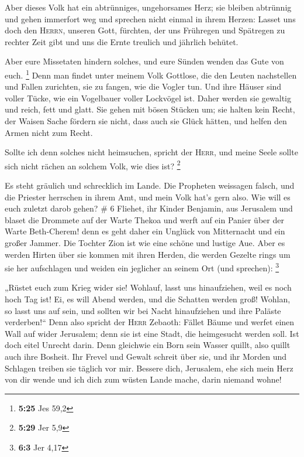  Aber dieses Volk hat ein abtrünniges, ungehorsames Herz;
sie bleiben abtrünnig und gehen immerfort weg  und
sprechen nicht einmal in ihrem Herzen: Lasset uns doch den
\textsc{Herrn}, unseren Gott, fürchten, der uns Frühregen und Spätregen
zu rechter Zeit gibt und uns die Ernte treulich und jährlich behütet.

 Aber eure Missetaten hindern solches, und eure Sünden
wenden das Gute von euch. \footnote{\textbf{5:25} Jes 59,2}
 Denn man findet unter meinem Volk Gottlose, die den
Leuten nachstellen und Fallen zurichten, sie zu fangen, wie die Vogler
tun.  Und ihre Häuser sind voller Tücke, wie ein
Vogelbauer voller Lockvögel ist. Daher werden sie gewaltig und reich,
fett und glatt.  Sie gehen mit bösen Stücken um; sie
halten kein Recht, der Waisen Sache fördern sie nicht, dass auch sie
Glück hätten, und helfen den Armen nicht zum Recht.

 Sollte ich denn solches nicht heimsuchen, spricht der
\textsc{Herr}, und meine Seele sollte sich nicht rächen an solchem Volk,
wie dies ist? \footnote{\textbf{5:29} Jer 5,9}

 Es steht gräulich und schrecklich im Lande.
 Die Propheten weissagen falsch, und die Priester
herrschen in ihrem Amt, und mein Volk hat's gern also. Wie will es euch
zuletzt darob gehen? \# 6  Fliehet, ihr Kinder Benjamin,
aus Jerusalem und blaset die Drommete auf der Warte Thekoa und werft auf
ein Panier über der Warte Beth-Cherem! denn es geht daher ein Unglück
von Mitternacht und ein großer Jammer.  Die Tochter Zion
ist wie eine schöne und lustige Aue.  Aber es werden
Hirten über sie kommen mit ihren Herden, die werden Gezelte rings um sie
her aufschlagen und weiden ein jeglicher an seinem Ort (und sprechen):
\footnote{\textbf{6:3} Jer 4,17}

 „Rüstet euch zum Krieg wider sie! Wohlauf, lasst uns
hinaufziehen, weil es noch hoch Tag ist! Ei, es will Abend werden, und
die Schatten werden groß!  Wohlan, so lasst uns auf sein,
und sollten wir bei Nacht hinaufziehen und ihre Paläste verderben!{}``
 Denn also spricht der \textsc{Herr} Zebaoth: Fället Bäume
und werfet einen Wall auf wider Jerusalem; denn sie ist eine Stadt, die
heimgesucht werden soll. Ist doch eitel Unrecht darin. 
Denn gleichwie ein Born sein Wasser quillt, also quillt auch ihre
Bosheit. Ihr Frevel und Gewalt schreit über sie, und ihr Morden und
Schlagen treiben sie täglich vor mir.  Bessere dich,
Jerusalem, ehe sich mein Herz von dir wende und ich dich zum wüsten
Lande mache, darin niemand wohne!

